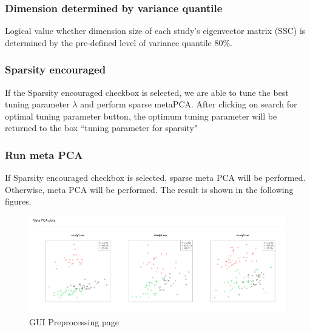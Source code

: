 \subsubsection{Dimension determined by variance quantile}
Logical value whether dimension size of each study's eigenvector matrix (SSC) is determined  by the pre-defined level of variance quantile 80\%.

\subsubsection{Sparsity encouraged}
If the Sparsity encouraged checkbox is selected, 
we are able to tune the best tuning parameter $\lambda$ and perform sparse metaPCA.
After clicking on search for optimal tuning parameter button, the optimum tuning parameter will be returned to the box ``tuning parameter for sparsity"

\subsubsection{Run meta PCA}
If Sparsity encouraged checkbox is selected, sparse meta PCA will be performed. 
Otherwise, meta PCA will be performed.
The result is shown in the following figures.

\begin{figure}[H]
\begin{center}
\includegraphics[scale=0.35]{./figure/metaPCA/metaPCA}
\caption{GUI Preprocessing page}
\label{fig:metaPCAresult}
\end{center}
\end{figure}

